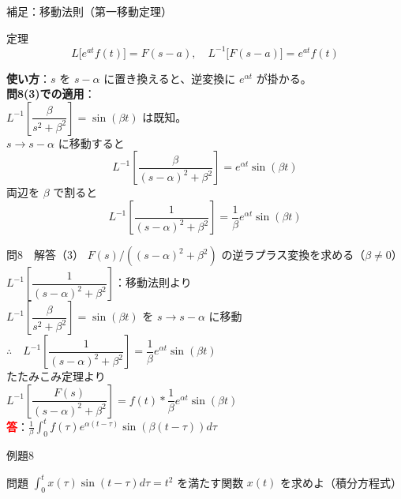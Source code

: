 \documentclass[professionalfonts]{beamer}
\begin{document}
\begin{frame}{補足：移動法則（第一移動定理）}
  \begin{block}{定理}
  \[
    L\bigl[e^{at}f(t)\bigr] = F(s-a), \quad
    L^{-1}\bigl[F(s-a)\bigr] = e^{at}f(t)
  \]
  \end{block}
  \textbf{使い方}：$s$ を $s-\alpha$ に置き換えると、逆変換に $e^{\alpha t}$ が掛かる。\\[6pt]
  \textbf{問8(3)での適用}：\\[4pt]
  $L^{-1}\!\left[\dfrac{\beta}{s^{2}+\beta^{2}}\right] = \sin(\beta t)$ は既知。\\[8pt]
  $s \to s-\alpha$ に移動すると
  \[
    L^{-1}\!\left[\frac{\beta}{(s-\alpha)^{2}+\beta^{2}}\right] = e^{\alpha t}\sin(\beta t)
  \]
  両辺を $\beta$ で割ると
  \[
    L^{-1}\!\left[\frac{1}{(s-\alpha)^{2}+\beta^{2}}\right] = \frac{1}{\beta}e^{\alpha t}\sin(\beta t)
  \]
\end{frame}

\begin{frame}{問8　解答（3）}
  $F(s)/((s-\alpha)^{2}+\beta^{2})$ の逆ラプラス変換を求める（$\beta \neq 0$）\\[8pt]
  $L^{-1}\!\left[\dfrac{1}{(s-\alpha)^{2}+\beta^{2}}\right]$：移動法則より\\[4pt]
  $L^{-1}\!\left[\dfrac{\beta}{s^{2}+\beta^{2}}\right] = \sin(\beta t)$ を $s \to s-\alpha$ に移動\\[8pt]
  $\therefore\quad L^{-1}\!\left[\dfrac{1}{(s-\alpha)^{2}+\beta^{2}}\right] = \dfrac{1}{\beta}e^{\alpha t}\sin(\beta t)$\\[8pt]
  たたみこみ定理より\\[4pt]
  $L^{-1}\!\left[\dfrac{F(s)}{(s-\alpha)^{2}+\beta^{2}}\right] = f(t) * \dfrac{1}{\beta}e^{\alpha t}\sin(\beta t)$
  \\[8pt]\textcolor{red}{\textbf{答}}：$\displaystyle\frac{1}{\beta}\int_{0}^t f(\tau)e^{\alpha(t-\tau)}\sin(\beta(t-\tau))d\tau$
\end{frame}

\begin{frame}{例題8}
  \begin{exampleblock}{問題}
    $\int_{0}^t x(\tau) \sin(t-\tau) d\tau = t^{2}$ を満たす関数 $x(t)$ を求めよ（積分方程式）\\[2pt]
  \end{exampleblock}
\end{frame}
\end{document}
